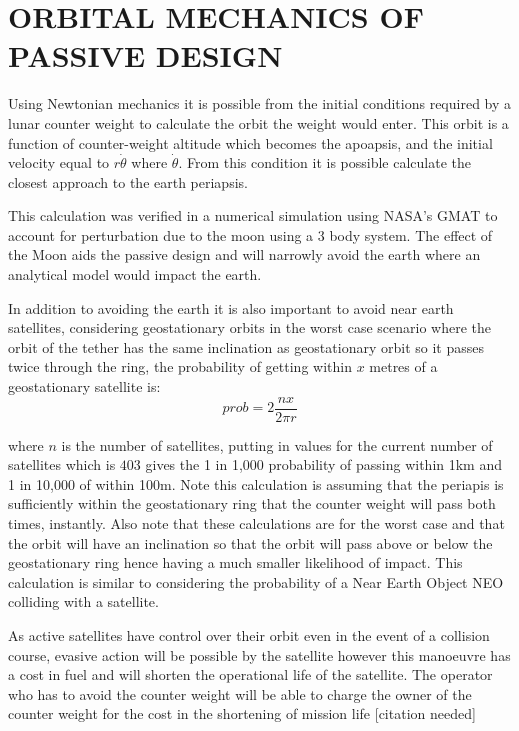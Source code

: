 \documentclass[twocolumn,prl,nobalancelastpage,aps,10pt]{revtex4-1}
\begin{document}
\section{ORBITAL MECHANICS OF PASSIVE DESIGN}

Using Newtonian mechanics it is possible from the initial conditions required by a lunar counter weight to calculate the orbit the weight would enter. This orbit is a function of counter-weight altitude which becomes the apoapsis, and the initial velocity equal to $r\dot{\theta}$ where $\dot{\theta}$. From this condition it is possible calculate the closest approach to the earth periapsis.

This calculation was verified in a numerical simulation using NASA's GMAT to account for perturbation due to the moon using a 3 body system. The effect of the Moon aids the passive design and will narrowly avoid the earth where an analytical model would impact the earth.

In addition to avoiding the earth it is also important to avoid near earth satellites, considering geostationary orbits in the worst case scenario where the orbit of the tether has the same inclination as geostationary orbit so it passes twice through the ring, the probability of getting within $x$ metres of a geostationary satellite is:
\begin{equation}
prob = 2 \frac{nx}{2\pi r}
\end{equation}

where $n$ is the number of satellites, putting in values for the current number of satellites which is $403$ gives the 1 in 1,000 probability of passing within 1km and 1 in 10,000 of within 100m. Note this calculation is assuming that the periapis is sufficiently within the geostationary ring that the counter weight will pass both times, instantly. Also note that these calculations are for the worst case and that the orbit will have an inclination so that the orbit will pass above or below the geostationary ring hence having a much smaller likelihood of impact. This calculation is similar to considering the probability of a Near Earth Object NEO colliding with a satellite.

As active satellites have control over their orbit even in the event of a collision course, evasive action will be possible by the satellite however this manoeuvre has a cost in fuel and will shorten the operational life of the satellite. The operator who has to avoid the counter weight will be able to charge the owner of the counter weight for the cost in the shortening of mission life [citation needed]
\end{document}
